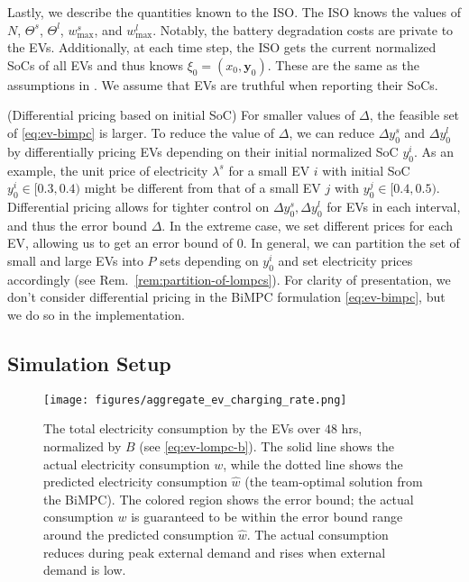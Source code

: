 Lastly, we describe the quantities known to the ISO.
The ISO knows the values of $N$, $\Theta^s$, $\Theta^l$, $w^s_\text{max}$, and $w^l_\text{max}$.
Notably, the battery degradation costs are private to the EVs.
Additionally, at each time step, the ISO gets the current normalized SoCs of all EVs and thus knows $\xi_0 = (x_0, \bm{y}_0)$.
These are the same as the assumptions in \cite{zou2017efficient}.
We assume that EVs are truthful when reporting their SoCs. 


\begin{remark} (Differential pricing based on initial SoC)
\label{rem:ev-differential-pricing}
For smaller values of $\Delta$, the feasible set of \eqref{eq:ev-bimpc} is larger.
To reduce the value of $\Delta$, we can reduce $\Delta y^s_0$ and $\Delta y^l_0$ by differentially pricing EVs depending on their initial normalized SoC $y^i_0$.
As an example, the unit price of electricity $\lambda^s$ for a small EV $i$ with initial SoC $y^i_0 \in [0.3, 0.4)$ might be different from that of a small EV $j$ with $y^j_0 \in [0.4, 0.5)$.
Differential pricing allows for tighter control on $\Delta y^s_0, \Delta y^l_0$ for EVs in each interval, and thus the error bound $\Delta$.
In the extreme case, we set different prices for each EV, allowing us to get an error bound of $0$.
In general, we can partition the set of small and large EVs into $P$ sets depending on $y^i_0$ and set electricity prices accordingly (see Rem.~\ref{rem:partition-of-lompcs}).
For clarity of presentation, we don't consider differential pricing in the BiMPC formulation \eqref{eq:ev-bimpc}, but we do so in the implementation.
\end{remark}


\subsection{Simulation Setup}
\label{subsec:ev-simulation-setup}

\begin{figure}%
    \centering
    \texttt{[image: figures/aggregate\_ev\_charging\_rate.png]}
    \caption{The total electricity consumption by the EVs over $48$ hrs, normalized by $B$ (see \eqref{eq:ev-lompc-b}).
    The solid line shows the actual electricity consumption $w$, while the dotted line shows the predicted electricity consumption $\hat{w}$ (the team-optimal solution from the BiMPC).
    The colored region shows the error bound; the actual consumption $w$ is guaranteed to be within the error bound range around the predicted consumption $\hat{w}$.
    The actual consumption reduces during peak external demand and rises when external demand is low.
    }
    \label{fig:ev-aggregate-charging-rate}
\end{figure}

